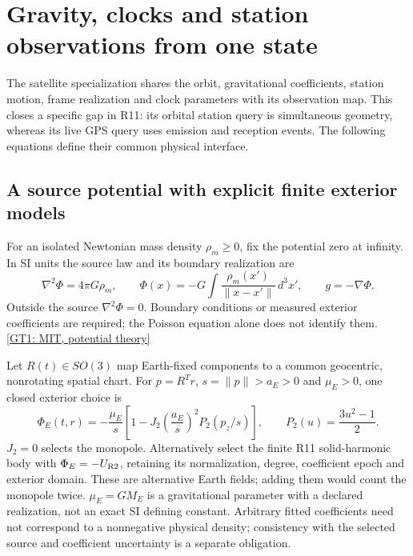 \section{Gravity, clocks and station observations from one state}
\label{r14-gravity-time}

The satellite specialization shares the orbit, gravitational coefficients,
station motion, frame realization and clock parameters with its observation
map. This closes a specific gap in R11: its orbital station query is
simultaneous geometry, whereas its live GPS query uses emission and reception
events. The following equations define their common physical interface.

\subsection{A source potential with explicit finite exterior models}
For an isolated Newtonian mass density $\rho_m\geq0$, fix the potential zero
at infinity. In SI units the source law and its boundary realization are
\begin{equation}
 \nabla^2\Phi=4\pi G\rho_m,\qquad
 \Phi(x)=-G\int\frac{\rho_m(x')}{\|x-x'\|}\,d^3x',\qquad
 g=-\nabla\Phi .
 \label{r14-poisson}
\end{equation}
Outside the source $\nabla^2\Phi=0$. Boundary conditions or measured exterior
coefficients are required; the Poisson equation alone does not identify them.
\href{https://ocw.mit.edu/courses/8-902-astrophysics-ii-fall-2004/a640fdbf6840889b97a7c3680cb2e4f1_lec4.pdf}{[GT1: MIT, potential theory]}

Let $R(t)\in SO(3)$ map Earth-fixed components to a common geocentric,
nonrotating spatial chart. For $p=R^Tr$, $s=\|p\|>a_E>0$ and $\mu_E>0$,
one closed exterior choice is
\begin{equation}
 \Phi_E(t,r)=-\frac{\mu_E}{s}
 \left[1-J_2\left(\frac{a_E}{s}\right)^2P_2(p_z/s)\right],
 \qquad P_2(u)=\frac{3u^2-1}{2} .
 \label{r14-exterior-potential}
\end{equation}
$J_2=0$ selects the monopole. Alternatively select the finite R11 solid-harmonic
body with $\Phi_E=-U_{\rm R2}$, retaining its normalization, degree, coefficient
epoch and exterior domain. These are alternative Earth fields; adding them
would count the monopole twice. $\mu_E=GM_E$ is a gravitational parameter with
a declared realization, not an exact SI defining constant. Arbitrary fitted
coefficients need not correspond to a nonnegative physical density; consistency
with the selected source and coefficient uncertainty is a separate obligation.

